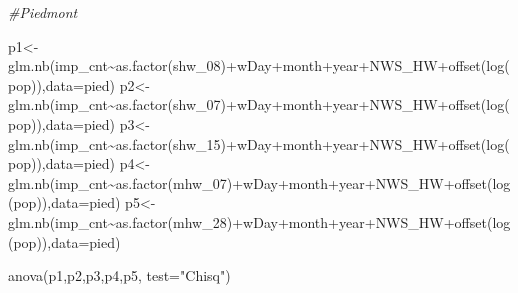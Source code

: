 \documentclass[
]{article}
\newenvironment{Shaded}{\begin{snugshade}}{\end{snugshade}}
\newcommand{\AttributeTok}[1]{\textcolor[rgb]{0.77,0.63,0.00}{#1}}
\newcommand{\CommentTok}[1]{\textcolor[rgb]{0.56,0.35,0.01}{\textit{#1}}}
\newcommand{\FunctionTok}[1]{\textcolor[rgb]{0.00,0.00,0.00}{#1}}
\newcommand{\NormalTok}[1]{#1}
\newcommand{\OtherTok}[1]{\textcolor[rgb]{0.56,0.35,0.01}{#1}}
\newcommand{\SpecialCharTok}[1]{\textcolor[rgb]{0.00,0.00,0.00}{#1}}
\newcommand{\StringTok}[1]{\textcolor[rgb]{0.31,0.60,0.02}{#1}}
\begin{document}
\begin{Shaded}
\begin{Highlighting}[]
\CommentTok{\#Piedmont}

\NormalTok{p1}\OtherTok{\textless{}{-}} \FunctionTok{glm.nb}\NormalTok{(imp\_cnt}\SpecialCharTok{\textasciitilde{}}\FunctionTok{as.factor}\NormalTok{(shw\_08)}\SpecialCharTok{+}\NormalTok{wDay}\SpecialCharTok{+}\NormalTok{month}\SpecialCharTok{+}\NormalTok{year}\SpecialCharTok{+}\NormalTok{NWS\_HW}\SpecialCharTok{+}\FunctionTok{offset}\NormalTok{(}\FunctionTok{log}\NormalTok{(pop)),}\AttributeTok{data=}\NormalTok{pied)}
\NormalTok{p2}\OtherTok{\textless{}{-}} \FunctionTok{glm.nb}\NormalTok{(imp\_cnt}\SpecialCharTok{\textasciitilde{}}\FunctionTok{as.factor}\NormalTok{(shw\_07)}\SpecialCharTok{+}\NormalTok{wDay}\SpecialCharTok{+}\NormalTok{month}\SpecialCharTok{+}\NormalTok{year}\SpecialCharTok{+}\NormalTok{NWS\_HW}\SpecialCharTok{+}\FunctionTok{offset}\NormalTok{(}\FunctionTok{log}\NormalTok{(pop)),}\AttributeTok{data=}\NormalTok{pied)}
\NormalTok{p3}\OtherTok{\textless{}{-}} \FunctionTok{glm.nb}\NormalTok{(imp\_cnt}\SpecialCharTok{\textasciitilde{}}\FunctionTok{as.factor}\NormalTok{(shw\_15)}\SpecialCharTok{+}\NormalTok{wDay}\SpecialCharTok{+}\NormalTok{month}\SpecialCharTok{+}\NormalTok{year}\SpecialCharTok{+}\NormalTok{NWS\_HW}\SpecialCharTok{+}\FunctionTok{offset}\NormalTok{(}\FunctionTok{log}\NormalTok{(pop)),}\AttributeTok{data=}\NormalTok{pied)}
\NormalTok{p4}\OtherTok{\textless{}{-}} \FunctionTok{glm.nb}\NormalTok{(imp\_cnt}\SpecialCharTok{\textasciitilde{}}\FunctionTok{as.factor}\NormalTok{(mhw\_07)}\SpecialCharTok{+}\NormalTok{wDay}\SpecialCharTok{+}\NormalTok{month}\SpecialCharTok{+}\NormalTok{year}\SpecialCharTok{+}\NormalTok{NWS\_HW}\SpecialCharTok{+}\FunctionTok{offset}\NormalTok{(}\FunctionTok{log}\NormalTok{(pop)),}\AttributeTok{data=}\NormalTok{pied)}
\NormalTok{p5}\OtherTok{\textless{}{-}} \FunctionTok{glm.nb}\NormalTok{(imp\_cnt}\SpecialCharTok{\textasciitilde{}}\FunctionTok{as.factor}\NormalTok{(mhw\_28)}\SpecialCharTok{+}\NormalTok{wDay}\SpecialCharTok{+}\NormalTok{month}\SpecialCharTok{+}\NormalTok{year}\SpecialCharTok{+}\NormalTok{NWS\_HW}\SpecialCharTok{+}\FunctionTok{offset}\NormalTok{(}\FunctionTok{log}\NormalTok{(pop)),}\AttributeTok{data=}\NormalTok{pied)}

\FunctionTok{anova}\NormalTok{(p1,p2,p3,p4,p5, }\AttributeTok{test=}\StringTok{"Chisq"}\NormalTok{)}
\end{Highlighting}
\end{Shaded}
\end{document}
